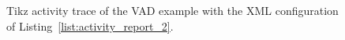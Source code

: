 \begin{figure}[htbp]
\centering
{}
\caption{Tikz activity trace of the VAD example with the XML configuration of Listing~\ref{list:activity_report_2}.} 
\label{fig:tikz_trace_only_img2}
\end{figure}


